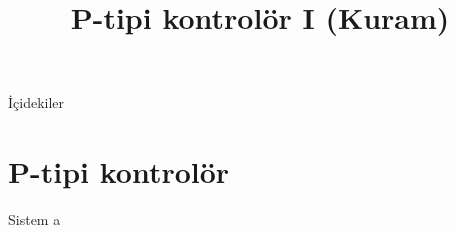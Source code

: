 
\title[Ders 9] {P-tipi kontrolör I (Kuram)}

\frame{\titlepage}
\begin{frame}[fragile]{İçidekiler}
    \tableofcontents
\end{frame}
\section{P-tipi kontrolör}
\begin{frame}[fragile]{Sistem}
    a
\end{frame}

